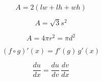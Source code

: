\[\begin{equation} A = 2 \left( l w + l h + w h \right) \end{equation}\]

\[\begin{equation} A = \sqrt{3} s^2 \end{equation}\]

\[\begin{equation} A = 4 \pi r^2 = \pi d^2 \end{equation}\]

\[\begin{equation} (f \circ g)' (x) = f'(g) \, g'(x) \end{equation}\]

\[\begin{equation} \frac {du}{dx} = \frac {du}{dv} \, \frac {dv}{dx} \end{equation}\]

